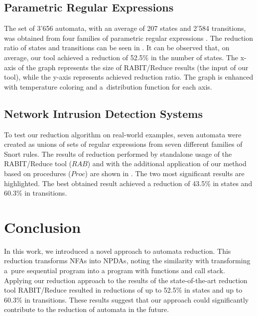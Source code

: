 \documentclass{ExcelAtFIT}
\begin{document}
	\subsection{Parametric Regular Expressions}
		The set of 3'656 automata, with an average of 207 states and 2'584 transitions, was obtained from four families of parametric regular expressions \cite{Regex_param}. The reduction ratio of states and transitions can be seen in . It can be observed that, on average, our tool achieved a reduction of 52.5\% in the number of states. The x-axis of the graph represents the size of RABIT/Reduce results (the input of our tool), while the y-axis represents achieved reduction ratio. The graph is enhanced with temperature coloring and a~distribution function for each axis.

	\subsection{Network Intrusion Detection Systems}
		To test our reduction algorithm on real-world examples, seven automata were created as unions of sets of regular expressions from seven different families of Snort rules. The results of reduction performed by standalone usage of the RABIT/Reduce tool ($RAB$) and with the additional application of our method based on procedures ($\mathit{Proc}$) are shown in . The two most significant results are highlighted. The best obtained result achieved a reduction of 43.5\% in states and 60.3\% in transitions.

\section{Conclusion}
	In this work, we introduced a novel approach to automata reduction. This reduction transforms NFAs into NPDAs, noting the similarity with transforming a~pure sequential program into a program with functions and call stack. Applying our reduction approach to the results of the state-of-the-art reduction tool RABIT/Reduce resulted in reductions of up to 52.5\% in states and up to 60.3\% in transitions. These results suggest that our approach could significantly contribute to the reduction of automata in the future.






\end{document}
